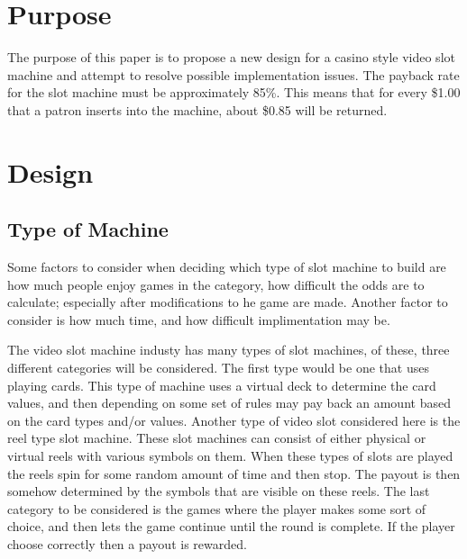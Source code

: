 
\section{Purpose}

The purpose of this paper is to propose a new design for a casino style video slot machine and
attempt to resolve possible implementation issues.  The payback rate for the slot machine must
be approximately 85\%.  This means that for every \$1.00 that a patron inserts into the machine,
about \$0.85 will be returned.


\section{Design}
\subsection{Type of Machine}

Some factors to consider when deciding which type of slot machine to build are how much people enjoy games in the category, how difficult the odds are to calculate; especially after modifications to he game are made.  Another factor to consider is how much time, and how difficult implimentation may be.

  The video slot machine industy has many types of slot machines, of these, three different categories will be considered.  The first type would be one that uses playing cards.  This type of machine uses a virtual deck to determine the card values, and then depending on some set of rules may pay back an amount based on the card types and/or values.  Another type of video slot considered here is the reel type slot machine.  These slot machines can consist of either physical or virtual reels with various symbols on them.  When these types of slots are played the reels spin for some random amount of time and then stop.  The payout is then somehow determined by the symbols that are visible on these reels.  The last category to be considered is the games where the player makes some sort of choice, and then lets the game continue until the round is complete.  If the player choose correctly then a payout is rewarded. 

